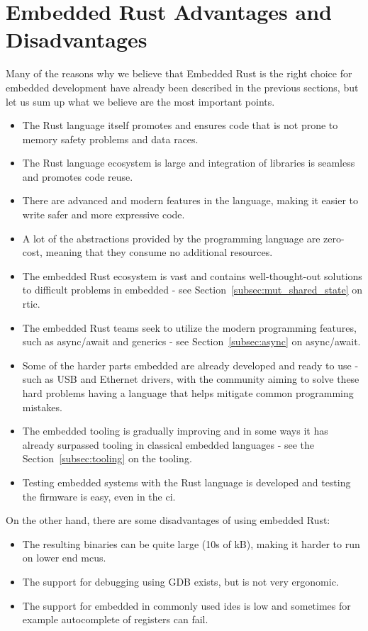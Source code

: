 \section{Embedded Rust Advantages and Disadvantages}
\label{sec:embedded_rust_reasoning}
Many of the reasons why we believe that Embedded Rust is the right choice for embedded development have already been described in the previous sections, but let us sum up what we believe are the most important points.
\begin{itemize}
    \item The Rust language itself promotes and ensures code that is not prone to memory safety problems and data races.
    \item The Rust language ecosystem is large and integration of libraries is seamless and promotes code reuse.
    \item There are advanced and modern features in the language, making it easier to write safer and more expressive code.
    \item A lot of the abstractions provided by the programming language are zero-cost, meaning that they consume no additional resources.
    \item The embedded Rust ecosystem is vast and contains well-thought-out solutions to difficult problems in embedded - see Section~\ref{subsec:mut_shared_state} on \acs{rtic}.
    \item The embedded Rust teams seek to utilize the modern programming features, such as async/await and generics - see Section~\ref{subsec:async} on async/await.
    \item Some of the harder parts embedded are already developed and ready to use - such as USB and Ethernet drivers, with the community aiming to solve these hard problems having a language that helps mitigate common programming mistakes.
    \item The embedded tooling is gradually improving and in some ways it has already surpassed tooling in classical embedded languages - see the Section~\ref{subsec:tooling} on the tooling.
    \item Testing embedded systems with the Rust language is developed and testing the firmware is easy, even in the \acs{ci}.
\end{itemize}

On the other hand, there are some disadvantages of using embedded Rust:
\begin{itemize}
    \item The resulting binaries can be quite large (10s of kB), making it harder to run on lower end \acs{mcu}s.
    \item The support for debugging using GDB exists, but is not very ergonomic.
    \item The support for embedded in commonly used \acs{ide}s is low and sometimes for example autocomplete of registers can fail.
\end{itemize}

